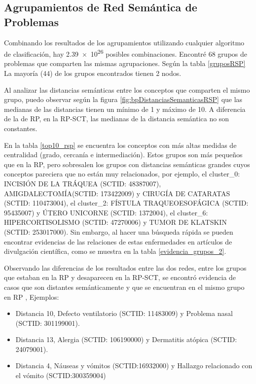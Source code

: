 \subsection{Agrupamientos de Red Semántica de Problemas}
Combinando los resultados de los agrupamientos utilizando cualquier algoritmo de clasificación, hay \num{2,39e26} posibles combinaciones. Encontré 68 grupos de problemas que comparten las mismas agrupaciones. Según la tabla \ref{gruposRSP} La mayoría (44) de los grupos encontrados tienen 2 nodos.

Al analizar las distancias semánticas entre los conceptos que comparten el mismo grupo, puedo observar según la figura \ref{fig:bpDistanciasSemanticasRSP} que las medianas de las distancias tienen un mínimo de 1 y máximo de 10. A diferencia de la de \acrshort{RP},  en la \acrshort{RP-SCT}, las medianas de la distancia semántica no son constantes. 

En la tabla \ref{top10_rsp} se encuentra los conceptos con más altas medidas de  centralidad (grado, cercanía e intermediación). Estos grupos son más pequeños que en la \acrshort{RP}, pero sobresalen los grupos con distancias semánticas grandes cuyos conceptos pareciera que no están muy relacionados, por ejemplo, el cluster\_0: INCISIÓN DE LA TRÁQUEA (SCTID: 48387007), AMIGDALECTOMÍA(SCTID: 173422009) y CIRUGÍA DE CATARATAS (SCTID: 110473004), el cluster\_2: FÍSTULA TRAQUEOESOFÁGICA (SCTID: 95435007) y ÚTERO UNICORNE (SCTID: 1372004), el cluster\_6: HIPERCORTISOLISMO (SCTID: 47270006) y TUMOR DE KLATSKIN (SCTID: 253017000). Sin embargo, al hacer una búsqueda rápida se pueden encontrar evidencias de las relaciones de estas enfermedades en artículos de divulgación científica, como se muestra en la tabla \ref{evidencia_grupos_2}.

Observando las diferencias de los resultados entre las dos redes, entre los grupos que estaban en la \acrshort{RP} y desaparecen en la \acrshort{RP-SCT},  se encontró evidencia de casos que son distantes semánticamente y que se encuentran en el mismo grupo en \acrshort{RP} , Ejemplos:
\begin{itemize}
\item Distancia 10, Defecto ventilatorio (SCTID: 11483009) y Problema nasal  (SCTID: 301199001).
\item Distancia 13, Alergia (SCTID: 106190000)  y Dermatitis atópica (SCTID: 24079001).
\item Distancia 4, Náuseas y vómitos (SCTID:16932000)  y Hallazgo relacionado con el vómito (SCTID:300359004)
\end{itemize}

